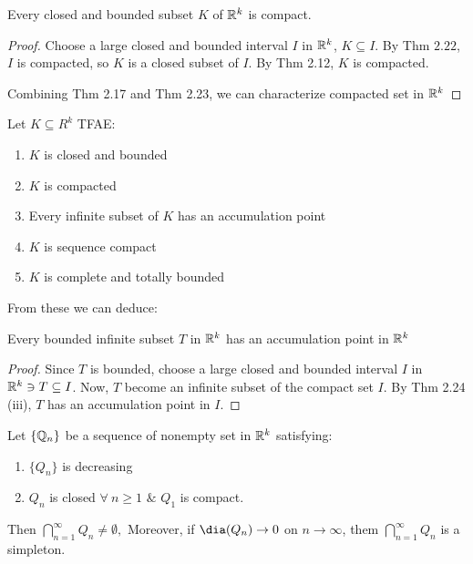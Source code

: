 \begin{thm}
	Every closed and bounded subset $K$ of $\mathbb{R}^k$ is compact.
\end{thm}

\begin{proof}
	Choose a large closed and bounded interval $I$ in $\mathbb{R}^k$, $K \subseteq I$. By Thm $2.22$, $I$ is compacted, so $K$ is a closed subset of $I$. By Thm 2.12, $K$ is compacted.
	
	Combining Thm 2.17 and Thm 2.23, we can characterize compacted set in $\mathbb{R}^k$
\end{proof}

\newpage

\begin{thm}
	Let $K \subseteq R^k$ TFAE:
	
	\begin{enumerate}[wide,label=\roman*)]
		\item $K$ is closed and bounded
		\item $K$ is compacted
		\item Every infinite subset of $K$ has an accumulation point
		\item $K$ is sequence compact
		\item $K$ is complete and totally bounded
	\end{enumerate}
\end{thm}

From these we can deduce:

\begin{thm}

Every bounded infinite subset $T$ in $\mathbb{R}^k$ has an accumulation point in $\mathbb{R}^k$
\end{thm}

\begin{proof}
	Since $T$ is bounded, choose a large closed and bounded interval $I$ in $\mathbb{R}^k \ni T \subseteq I$. Now, $T$ become an infinite subset of the compact set $I$. By Thm 2.24 (iii), $T$ has an accumulation point in $I$.
\end{proof}

\begin{thm}
	Let $\{\mathbb{Q}_n\}$ be a sequence of nonempty set in $\mathbb{R}^k$ satisfying:
	\begin{enumerate}[label = \alph*)]
		\item $\{Q_n\}$ is decreasing
		\item $Q_n$ is closed $\forall~n \geq 1$ $\&$ $Q_1$ is compact.
	\end{enumerate}
	
	Then $\bigcap^{\infty}_{n = 1}Q_n \neq \emptyset,$ Moreover, if $\dia(Q_n) \rightarrow 0$ on $n \rightarrow \infty$, them $\bigcap^{\infty}_{n=1} Q_n$ is a simpleton.
\end{thm}

